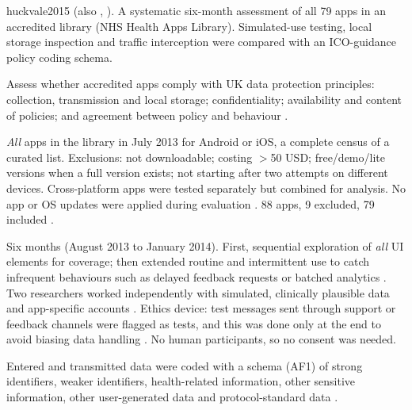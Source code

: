 \begin{papercard}{huckvale2015}
    (also , ). A systematic six-month assessment of all 79 apps in an accredited library (NHS Health Apps Library). Simulated-use testing, local storage inspection and traffic interception were compared with an ICO-guidance policy coding schema.

 Assess whether accredited apps comply with UK data protection principles: collection, transmission and local storage; confidentiality; availability and content of policies; and agreement between policy and behaviour .

 \emph{All} apps in the library in July 2013 for Android or iOS, a complete census of a curated list. Exclusions: not downloadable; costing $>$50 USD; free/demo/lite versions when a full version exists; not starting after two attempts on different devices. Cross-platform apps were tested separately but combined for analysis. No app or OS updates were applied during evaluation . 88 apps, 9 excluded, 79 included .

 Six months (August 2013 to January 2014). First, sequential exploration of \emph{all} UI elements for coverage; then extended routine and intermittent use to catch infrequent behaviours such as delayed feedback requests or batched analytics . Two researchers worked independently with simulated, clinically plausible data and app-specific accounts . Ethics device: test messages sent through support or feedback channels were flagged as tests, and this was done only at the end to avoid biasing data handling . No human participants, so no consent was needed.

 Entered and transmitted data were coded with a schema (AF1) of strong identifiers, weaker identifiers, health-related information, other sensitive information, other user-generated data and protocol-standard data .


\end{papercard}
